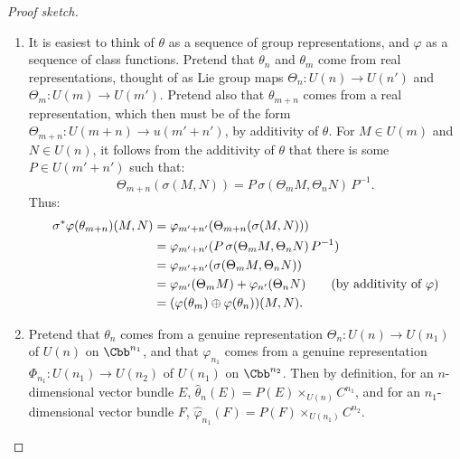 \begin{proof}[Proof sketch]\leavevmode

\begin{enumerate}
\item It is easiest to think of $\theta$ as a sequence of group representations, and $\varphi$ as a sequence of class functions. Pretend that $\theta_n$ and $\theta_m$ come from real representations, thought of as Lie group maps $\Theta_n:U(n) \to U(n')$ and $\Theta_m:U(m)\to U(m')$. Pretend also that $\theta_{m+n}$ comes from a real representation, which then must be of the form $\Theta_{m+n}:U(m+n)\to u(m'+n')$, by additivity of $\theta$. For $M \in U(m)$ and $N \in U(n)$, it follows from the additivity of $\theta$ that there is some $P\in U(m'+n')$ such that:
\[\Theta_{m+n}(\sigma(M,N))=P\,\sigma(\Theta_mM,\Theta_nN)\,P^{-1}.\]
Thus:
\begin{align*}
\sigma^* \varphi(\theta_{m+n})(M, N) & = \varphi_{m'+n'} (\Theta_{m+n}(\sigma(M,N))) \\
& = \varphi_{m'+n'} (P\,\sigma(\Theta_mM,\Theta_nN)\,P^{-1}) \\
& = \varphi_{m'+n'} (\sigma(\Theta_mM,\Theta_nN)) \\
& = \varphi_{m'} (\Theta_m M) + \varphi_{n'} (\Theta_n N) \textup{\qquad(by additivity of $\varphi$)}\\
& = (\varphi(\theta_m) \oplus \varphi(\theta_n)) (M, N).
\end{align*}
%
%
\item Pretend that $\theta_{n}$ comes from a genuine representation $\Theta_n:U(n) \to U(n_1)$ of $U(n)$ on $\Cbb^{n_1}$, and that $\varphi_{n_1}$ comes from a genuine representation $\Phi_{n_1}:U(n_1) \to U(n_2)$ of $U(n_1)$ on $\Cbb^{n_2}$. Then by definition, for an $n$-dimensional vector bundle $E$, $\hat \theta_n(E) = P(E) \times_{U(n)} C^{n_1}$, and for an $n_1$-dimensional vector bundle $F$, $\hat \varphi_{n_1}(F) = P(F) \times_{U(n_1)} C^{n_2}$.


\end{enumerate}
\end{proof}
